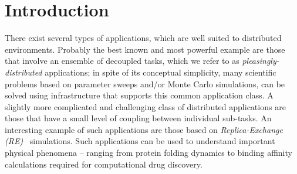 \documentclass{rspublic}
\newcommand{\kimnote}[1]{ {\textcolor{green} { ***JK: #1 }}}
\newcommand{\jhanote}[1]{ {\textcolor{red} { ***SJ: #1 }}}
\newcommand{\kimnote}[1]{}
\newcommand{\jhanote}[1]{}
\begin{document}
\begin{abstract}{REMD, SAGA, Migol, Fault Tolerance}
\end{abstract}

\section{Introduction}
                           
There exist several types of applications, which are well suited
to distributed environments. Probably the best known and most powerful
example are those that involve an ensemble of decoupled tasks, which
we refer to as {\it pleasingly-distributed} applications; in spite of
its conceptual simplicity, many scientific problems based on parameter
sweeps and/or Monte Carlo simulations, can be solved using
infrastructure that supports this common application class. A slightly
more complicated and challenging class of distributed applications are
those that have a small level of coupling between individual
sub-tasks.  An interesting example of such applications are those
based on \emph{Replica-Exchange (RE)}~\cite{hansmann,Sugita:1999rm}
simulations.  Such applications can be used to understand important
physical phenomena -- ranging from protein folding dynamics to binding
affinity calculations required for computational drug discovery.


  

              
\end{document}
